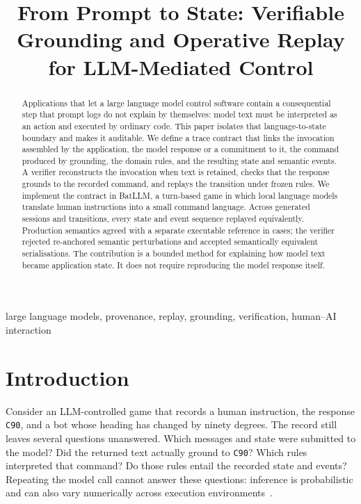 \documentclass[conference,a4paper]{IEEEtran}
\title{From Prompt to State: Verifiable Grounding and Operative Replay for LLM-Mediated Control}
\author{\IEEEauthorblockN{Tomas Laurenzo}
\IEEEauthorblockA{Department of Critical Media Practices\\
University of Colorado Boulder\\
Boulder, Colorado, USA\\
tomas@laurenzo.net}}
\begin{document}
\raggedbottom
\maketitle

\begin{abstract}
Applications that let a large language model control software contain a consequential step that prompt logs do not explain by themselves: model text must be interpreted as an action and executed by ordinary code. This paper isolates that language-to-state boundary and makes it auditable. We define a trace contract that links the invocation assembled by the application, the model response or a commitment to it, the command produced by grounding, the domain rules, and the resulting state and semantic events. A verifier reconstructs the invocation when text is retained, checks that the response grounds to the recorded command, and replays the transition under frozen rules. We implement the contract in BatLLM, a turn-based game in which local language models translate human instructions into a small command language. Across \ResultSessions{} generated sessions and \ResultPlays{} transitions, every state and event sequence replayed equivalently. Production semantics agreed with a separate executable reference in \ResultDifferentialCases{} cases; the verifier rejected \ResultFaults{} re-anchored semantic perturbations and accepted \ResultSerializationVariants{} semantically equivalent serialisations. The contribution is a bounded method for explaining how model text became application state. It does not require reproducing the model response itself.
\end{abstract}

\begin{IEEEkeywords}
large language models, provenance, replay, grounding, verification, human--AI interaction
\end{IEEEkeywords}

\section{Introduction}
Consider an LLM-controlled game that records a human instruction, the response \texttt{C90}, and a bot whose heading has changed by ninety degrees. The record still leaves several questions unanswered. Which messages and state were submitted to the model? Did the returned text actually ground to \texttt{C90}? Which rules interpreted that command? Do those rules entail the recorded state and events? Repeating the model call cannot answer these questions: inference is probabilistic and can also vary numerically across execution environments~\cite{yuan2025nondeterminism}.
\end{document}
